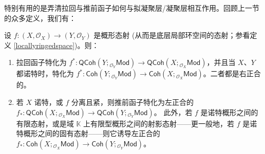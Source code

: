 特别有用的是弄清拉回与推前函子如何与拟凝聚层/凝聚层相互作用。回顾上一节的众多定义，我们有：

\begin{Pro}\label{pushpullcoherent}
设 $f:(X,\mathcal{O}_X)\rightarrow (Y,\mathcal{O}_Y)$ 是概形态射 \textup(从而是底层局部环空间的态射；参看定义 \ref{locallyringedspace}\textup)。则：
\renewcommand{\theenumi}{\roman{enumi}}
\begin{enumerate}[leftmargin=0.6cm]
	\item 拉回函子特化为 $f^*\!\!: \mathsf{QCoh}(Y;{}_{\mathcal{O}_Y}\!\mathsf{Mod})\!\rightarrow\!\mathsf{QCoh}(X;{}_{\mathcal{O}_X}\!\mathsf{Mod})$，并且当 $X$、$Y$ 都诺特时，特化为 $f^*\!: \mathsf{Coh}(Y;{}_{\mathcal{O}_Y}\!\mathsf{Mod})\rightarrow \mathsf{Coh}(X;{}_{\mathcal{O}_X}\!\mathsf{Mod})$。二者都是右正合的。
	
	\item 若 $X$ 诺特，或 $f$ 分离且紧，则推前函子特化为左正合的 $f_*\!: \mathsf{QCoh}(X;{}_{\mathcal{O}_X}\!\mathsf{Mod})\!\rightarrow \!\mathsf{QCoh}(Y;{}_{\mathcal{O}_Y}\!\mathsf{Mod})$。 
	\newline 此外，若 $f$ 是诺特概形之间的有限态射，或是域 $\mathbb{K}$ 上有限型概形之间的射影态射——更一般地，若 $f$ 是诺特概形之间的固有态射——则它诱导左正合的 $f_*: \mathsf{Coh}(X;{}_{\mathcal{O}_X}\!\mathsf{Mod})\rightarrow \mathsf{Coh}(Y;{}_{\mathcal{O}_Y}\!\mathsf{Mod})$。  
\end{enumerate}
\end{Pro}

